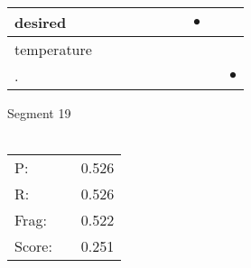 \documentclass[landscape]{article}
\newcommand{\ssp}{\hspace{2pt}}
\newcommand{\mex}{\cellcolor{g}$\bullet$}
\begin{document}
\begin{tabular}{|l|p{10pt}|p{10pt}|p{10pt}|p{10pt}|p{10pt}|p{10pt}|p{10pt}|p{10pt}|p{10pt}|}
\hline
\ssp \cellcolor{ref6}desired \ssp&\hspace{2pt}&\hspace{2pt}&\hspace{2pt}&\hspace{2pt}&\hspace{2pt}&\hspace{2pt}&\hspace{2pt}\mex&\hspace{2pt}&\hspace{2pt}\\
\hline
\ssp temperature \ssp&\hspace{2pt}&\hspace{2pt}&\hspace{2pt}&\hspace{2pt}&\hspace{2pt}&\hspace{2pt}&\hspace{2pt}&\hspace{2pt}&\hspace{2pt}\\
\hline
\ssp \cellcolor{ref8}. \ssp&\hspace{2pt}&\hspace{2pt}&\hspace{2pt}&\hspace{2pt}&\hspace{2pt}&\hspace{2pt}&\hspace{2pt}&\hspace{2pt}&\hspace{2pt}\mex\\
\hline
\end{tabular}

\vspace{6pt}
\noindent Segment 19\\\\
\noindent\begin{tabular}{lm{12pt}r}
\hline
P:&&0.526\\
R:&&0.526\\
Frag:&&0.522\\
Score:&&0.251\\
\end{tabular}

\newpage
\end{document}
